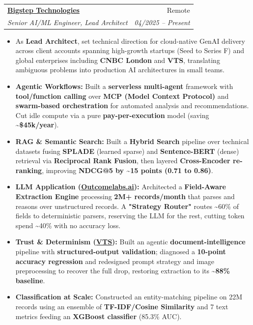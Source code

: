 \documentclass[11pt,a4paper]{article}
\makeatletter
\newcommand{\resumeItem}[1]{
  \item\small{
    {#1 \vspace{-2pt}}
  }
}
\newcommand{\resumeSubheading}[4]{
  \vspace{-1pt}\item
    \begin{tabular*}{0.97\textwidth}[t]{l@{\extracolsep{\fill}}r}
      \textbf{#1} & #2 \\
      \textit{\small#3} & \textit{\small #4} \\
    \end{tabular*}\vspace{-5pt}
}
\newcommand{\resumeItemListStart}{\begin{itemize}[itemsep=2pt, topsep=0pt, partopsep=0pt]}
\newcommand{\resumeItemListEnd}{\end{itemize}\vspace{-5pt}}
\makeatother
\begin{document}
    \resumeSubheading
      {\href{https://bigsteptech.com/}{Bigstep Technologies}}{Remote}
      {Senior AI/ML Engineer, Lead Architect}{04/2025 -- Present}
      \resumeItemListStart
        \resumeItem{As \textbf{Lead Architect}, set technical direction for cloud-native GenAI delivery across client accounts spanning high-growth startups (Seed to Series F) and global enterprises including \textbf{CNBC London} and \textbf{VTS}, translating ambiguous problems into production AI architectures in small teams.}
        \resumeItem{\textbf{Agentic Workflows:} Built a \textbf{serverless multi-agent} framework with \textbf{tool/function calling} over \textbf{MCP (Model Context Protocol)} and \textbf{swarm-based orchestration} for automated analysis and recommendations. Cut idle compute via a pure \textbf{pay-per-execution} model (saving \textbf{\textasciitilde{}\$45k/year}).}
        \resumeItem{\textbf{RAG \& Semantic Search:} Built a \textbf{Hybrid Search} pipeline over technical datasets fusing \textbf{SPLADE} (learned sparse) and \textbf{Sentence-BERT} (dense) retrieval via \textbf{Reciprocal Rank Fusion}, then layered \textbf{Cross-Encoder re-ranking}, improving \textbf{NDCG@5 by \textasciitilde{}15 points (0.71 to 0.86)}.}
        \resumeItem{\textbf{LLM Application (\href{https://www.outcomelabs.ai/}{Outcomelabs.ai}):} Architected a \textbf{Field-Aware Extraction Engine} processing \textbf{2M+ records/month} that parses and reasons over unstructured records. A \textbf{"Strategy Router"} routes \textasciitilde{}60\% of fields to deterministic parsers, reserving the LLM for the rest, cutting token spend \textasciitilde{}40\% with no accuracy loss.}
        \resumeItem{\textbf{Trust \& Determinism (\href{https://www.vts.com/}{VTS}):} Built an agentic \textbf{document-intelligence} pipeline with \textbf{structured-output validation}; diagnosed a \textbf{10-point accuracy regression} and redesigned prompt strategy and image preprocessing to recover the full drop, restoring extraction to its \textbf{\textasciitilde{}88\% baseline}.}
        \resumeItem{\textbf{Classification at Scale:} Constructed an entity-matching pipeline on 22M records using an ensemble of \textbf{TF-IDF/Cosine Similarity} and 7 text metrics feeding an \textbf{XGBoost classifier} (85.3\% AUC).}
      \resumeItemListEnd
\end{document}
